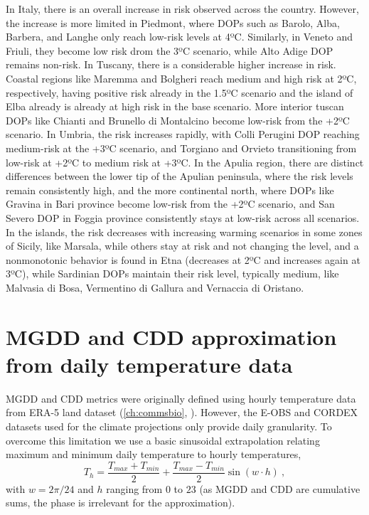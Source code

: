 In Italy, there is an overall increase in risk observed across the country.
However, the increase is more limited in Piedmont, where DOPs such as Barolo,
Alba, Barbera, and Langhe only reach low-risk levels at 4ºC. Similarly, in
Veneto and Friuli, they become low risk drom the 3ºC scenario, while Alto Adige
DOP remains non-risk. In Tuscany, there is a considerable higher increase in
risk. Coastal regions like Maremma and Bolgheri reach medium and high risk at
2ºC, respectively, having positive risk already in the 1.5ºC scenario and the
island of Elba already is already at high risk in the base scenario. More
interior tuscan DOPs like Chianti and Brunello di Montalcino become low-risk
from the +2ºC scenario. In Umbria, the risk increases rapidly, with Colli
Perugini DOP reaching medium-risk at the +3ºC scenario, and Torgiano and
Orvieto transitioning from low-risk at +2ºC to medium risk at +3ºC. In the
Apulia region, there are distinct differences between the lower tip of the
Apulian peninsula, where the risk levels remain consistently high, and the more
continental north, where DOPs like Gravina in Bari province become low-risk
from the +2ºC scenario, and San Severo DOP in Foggia province consistently
stays at low-risk across all scenarios. In the islands, the risk decreases with
increasing warming scenarios in some zones of Sicily, like Marsala, while
others stay at risk and not changing the level, and a nonmonotonic behavior is
found in Etna (decreases at 2ºC and increases again at 3ºC), while Sardinian
DOPs maintain their risk level, typically medium, like Malvasia di Bosa,
Vermentino di Gallura and Vernaccia di Oristano.

\section{MGDD and CDD approximation from daily temperature data}

MGDD and CDD metrics were originally defined using hourly temperature data from
ERA-5 land dataset
(\cref{ch:commsbio}, \cite{GimenezRomero2022_CommsBio}). However, the E-OBS and
CORDEX datasets used for the climate projections only provide daily
granularity.
To overcome this limitation we use a basic sinusoidal
extrapolation relating maximum and minimum daily temperature to hourly
temperatures,
\begin{equation}\label{eq:approx}
    T_h=\frac{T_{max}+T_{min}}{2} + \frac{T_{max}-T_{min}}{2}\sin(w\cdot h)
    \ ,
\end{equation}
with $w=2\pi/24$ and $h$ ranging from $0$ to $23$ (as MGDD and CDD are
cumulative sums, the phase is irrelevant for the approximation).


